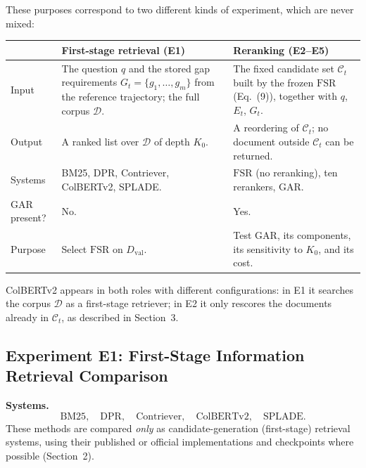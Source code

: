 \documentclass[11pt,a4paper]{article}
\begin{document}
These purposes correspond to two different kinds of experiment, which are never mixed:

\begin{center}
\small
\begin{tabularx}{\textwidth}{>{\raggedright\arraybackslash}p{2.5cm}>{\raggedright\arraybackslash}X>{\raggedright\arraybackslash}X}
\toprule
 & \textbf{First-stage retrieval (E1)} & \textbf{Reranking (E2--E5)}\\
\midrule
Input & The question $q$ and the stored gap requirements $G_t=\{g_1,\ldots,g_m\}$ from the reference trajectory; the full corpus $\mathcal{D}$. & The fixed candidate set $\mathcal{C}_t$ built by the frozen $\mathrm{FSR}$ (Eq.~(9)), together with $q$, $E_t$, $G_t$.\\
Output & A ranked list over $\mathcal{D}$ of depth $K_0$. & A reordering of $\mathcal{C}_t$; no document outside $\mathcal{C}_t$ can be returned.\\
Systems & BM25, DPR, Contriever, ColBERTv2, SPLADE. & $\mathrm{FSR}$ (no reranking), ten rerankers, GAR.\\
GAR present? & No. & Yes.\\
Purpose & Select $\mathrm{FSR}$ on $D_{\mathrm{val}}$. & Test GAR, its components, its sensitivity to $K_0$, and its cost.\\
\bottomrule
\end{tabularx}
\end{center}

ColBERTv2 appears in both roles with different configurations: in E1 it searches the corpus $\mathcal{D}$ as a first-stage retriever; in E2 it only rescores the documents already in $\mathcal{C}_t$, as described in Section~3.

\subsection{Experiment E1: First-Stage Information Retrieval Comparison}
\label{sec:e1}

\textbf{Systems.}
\[
\text{BM25},\quad \text{DPR},\quad \text{Contriever},\quad \text{ColBERTv2},\quad \text{SPLADE}.
\]
These methods are compared \emph{only} as candidate-generation (first-stage) retrieval systems, using their published or official implementations and checkpoints where possible (Section~2).
\end{document}
